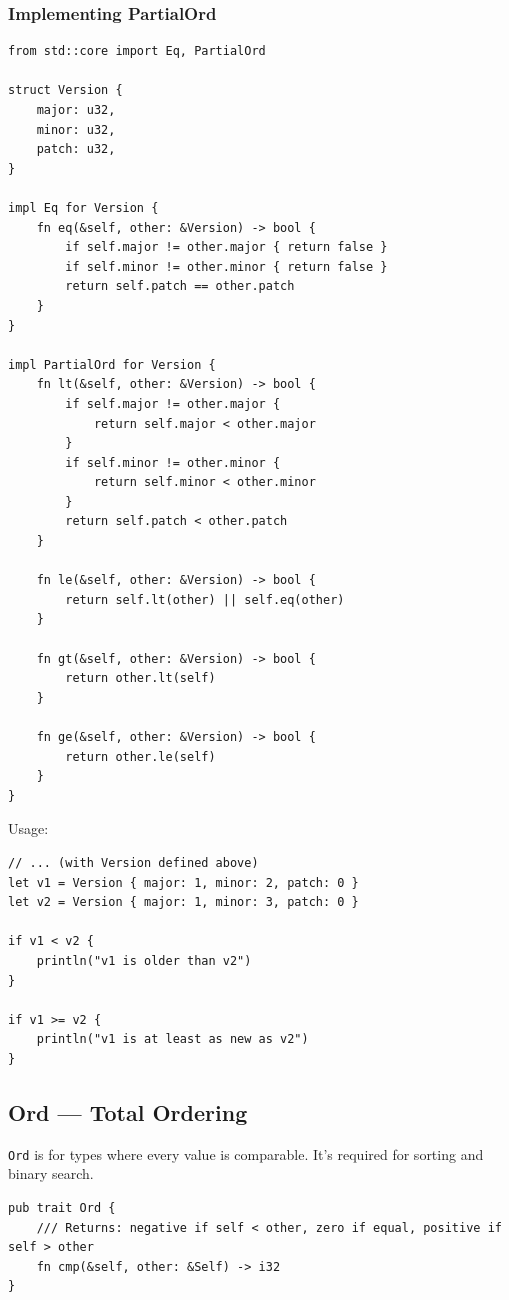 \subsubsection{Implementing PartialOrd}

\begin{lstlisting}
from std::core import Eq, PartialOrd

struct Version {
    major: u32,
    minor: u32,
    patch: u32,
}

impl Eq for Version {
    fn eq(&self, other: &Version) -> bool {
        if self.major != other.major { return false }
        if self.minor != other.minor { return false }
        return self.patch == other.patch
    }
}

impl PartialOrd for Version {
    fn lt(&self, other: &Version) -> bool {
        if self.major != other.major {
            return self.major < other.major
        }
        if self.minor != other.minor {
            return self.minor < other.minor
        }
        return self.patch < other.patch
    }

    fn le(&self, other: &Version) -> bool {
        return self.lt(other) || self.eq(other)
    }

    fn gt(&self, other: &Version) -> bool {
        return other.lt(self)
    }

    fn ge(&self, other: &Version) -> bool {
        return other.le(self)
    }
}
\end{lstlisting}

Usage:

\begin{lstlisting}
// ... (with Version defined above)
let v1 = Version { major: 1, minor: 2, patch: 0 }
let v2 = Version { major: 1, minor: 3, patch: 0 }

if v1 < v2 {
    println("v1 is older than v2")
}

if v1 >= v2 {
    println("v1 is at least as new as v2")
}
\end{lstlisting}

\subsection{Ord --- Total Ordering}

\texttt{Ord} is for types where every value is comparable. It's required for sorting and binary search.

\begin{lstlisting}
pub trait Ord {
    /// Returns: negative if self < other, zero if equal, positive if self > other
    fn cmp(&self, other: &Self) -> i32
}
\end{lstlisting}

